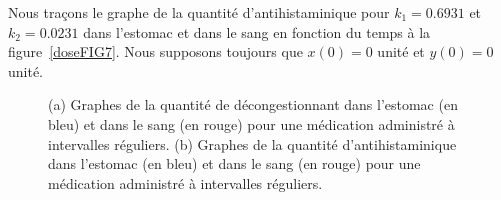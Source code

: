 {\begin{egg}
Nous traçons le graphe de la quantité d'antihistaminique pour $k_1=0.6931$
et $k_2=0.0231$ dans l'estomac et dans le sang en fonction du temps à la
figure~\ref{doseFIG7}.  Nous supposons toujours que $x(0)=0$ unité et $y(0)=0$
unité.

\begin{figure}
\centering
{}
\qquad
{}
\caption[Graphes de la quantité de décongestionnant et
d'antihistaminique dans l'estomac et dans le sang pour une médication
administré à intervalles réguliers]
{(a) Graphes de la quantité de décongestionnant dans l'estomac (en
bleu) et dans le sang (en rouge) pour une médication administré à
intervalles réguliers.
(b) Graphes de la quantité d'antihistaminique dans l'estomac (en
bleu) et dans le sang (en rouge) pour une médication administré à
intervalles réguliers.}\label{doseFIG67}
\end{figure}




\end{egg}}
